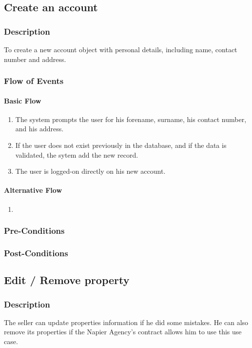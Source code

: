 \documentclass[a4paper,12pt]{article}
\begin{document}
\subsection{Create an account}
\subsubsection{Description}
To create a new account object with personal details, including name, contact number and address.
\subsubsection{Flow of Events}
\paragraph{Basic Flow}
\begin{enumerate}
\item The system prompts the user for his forename, surname, his contact number, and his address.
\item If the user does not exist previously in the database, and if the data is validated, the sytem add the new record.
\item The user is logged-on directly on his new account.
\end{enumerate}
\paragraph{Alternative Flow}
\begin{enumerate}
\item
\end{enumerate}
\subsubsection{Pre-Conditions}
\subsubsection{Post-Conditions}

\subsection{Edit / Remove property}
\subsubsection{Description}
The seller can update properties information if he did some mistakes. He can also remove its properties if the Napier Agency's contract allows him to use this use case.
\end{document}
